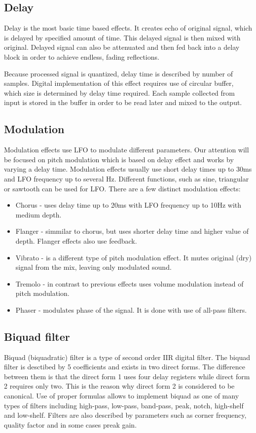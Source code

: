 \documentclass[a4paper,twoside,12pt]{book}
\begin{document}
\subsection{Delay}
Delay is the most basic time based effects.
It creates echo of original signal,
which is delayed by specified amount of time.
This delayed signal is then mixed with original.
Delayed signal can also be attenuated and then fed back into a delay block
in order to achieve endless, fading reflections.

Because processed signal is quantized,
delay time is described by number of samples.
Digital implementation of this effect requires use of circular buffer,
which size is determined by delay time required.
Each sample collected from input is stored in the buffer
in order to be read later and mixed to the output.

\subsection{Modulation}
Modulation effects use LFO to modulate different parameters.
Our attention will be focused on pitch modulation
which is based on delay effect and works by varying a delay time.
Modulation effects usually use short delay times up to 30ms
and LFO frequency up to several Hz.
Different functions, such as sine,
triangular or sawtooth can be used for LFO.
There are a few distinct modulation effects:
\begin{itemize}
    \item Chorus - uses delay time up to 20ms with LFO frequency up to 10Hz with medium depth.
    \item Flanger - simmilar to chorus, but uses shorter delay time and higher value of depth.
        Flanger effects also use feedback.
    \item Vibrato - is a different type of pitch modulation effect. It mutes original (dry) signal
        from the mix, leaving only modulated sound.
    \item Tremolo - in contrast to previous effects uses volume modulation instead of pitch modulation.
    \item Phaser - modulates phase of the signal. It is done with use of all-pass filters.
\end{itemize}

\subsection{Biquad filter}
Biquad (biquadratic) filter is a type of second order IIR digital filter.
The biquad filter is desctibed by 5 coefficients and exists in two direct forms.
The difference between them is that the direct form 1 uses four delay registers
while direct form 2 requires only two.
This is the reason why direct form 2 is considered to be canonical.
Use of proper formulas allows to implement biquad as one of many types of filters
including high-pass, low-pass, band-pass, peak, notch, high-shelf and low-shelf.
Filters are also described by parameters such as corner frequency, quality factor
and in some cases preak gain.
\cite{Biquad}
\cite{biquad_web}
\end{document}
